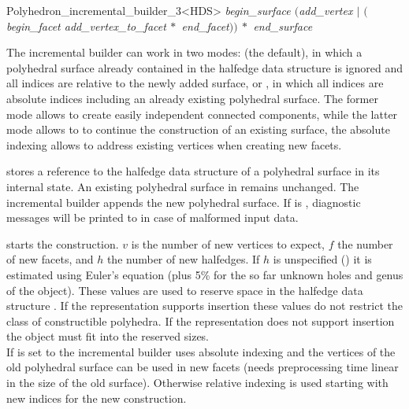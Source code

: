 \begin{ccRefClass}{Polyhedron_incremental_builder_3<HDS>}
{\it
    \hspace*{6mm} begin\_surface $($add\_vertex $|$ 
                  $($begin\_facet add\_vertex\_to\_facet$\:*$
                            end\_facet\/$))\:*$ end\_surface
}

The incremental builder can work in two modes:  (the
default), in which a polyhedral surface already contained in the
halfedge data structure is ignored and all indices are relative to the
newly added surface, or , in which all indices are
absolute indices including an already existing polyhedral surface. The
former mode allows to create easily independent connected components,
while the latter mode allows to to continue the construction of an
existing surface, the absolute indexing allows to address existing
vertices when creating new facets.


\ccTypes


\ccGlue
{}
\ccGlue
{}

\ccConstants



\ccCreation
{}
\ccThreeToTwo

 {stores a reference to the halfedge data structure  of a
   polyhedral surface in its internal state. An existing polyhedral
   surface in  remains unchanged. The incremental builder
   appends the new polyhedral surface. If  is ,
   diagnostic messages will be printed to  in case of
   malformed input data.}

\ccOperations

{starts the construction. $v$ is the number of new vertices
    to expect, $f$ the number of new facets, and $h$ the number of
    new halfedges. If $h$ is unspecified () it is estimated using
    Euler's equation (plus 5\% for the so far unknown holes and genus of
    the object). These values are used to reserve space in the
    halfedge data structure . If the representation supports
    insertion these values do not restrict the class of constructible
    polyhedra. If the representation does not support insertion the
    object must fit into the reserved sizes.\\
    If  is set to  the incremental builder
    uses absolute indexing and the vertices of the old polyhedral surface
    can be used in new facets (needs preprocessing time linear in the
    size of the old surface). Otherwise relative indexing is used 
    starting with new indices for the new construction.}


\end{ccRefClass}
